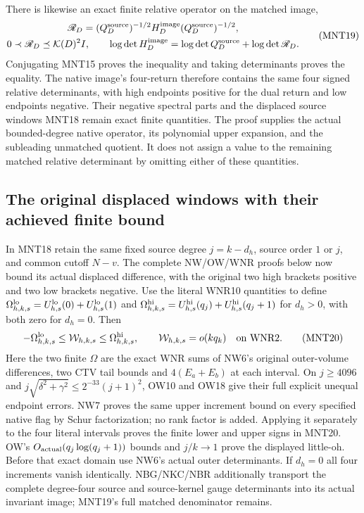 \documentclass[11pt,a4paper]{article}
\begin{document}
There is likewise an exact finite relative operator
on the matched image,
\[
 \begin{gathered}
 \mathscr R_D=(Q_D^{\rm source})^{-1/2}
                    H_D^{\rm image}(Q_D^{\rm source})^{-1/2},\\
 0\prec\mathscr R_D\preceq\mathcal K(D)^2I,\qquad
 \log\det H_D^{\rm image}
    =\log\det Q_D^{\rm source}+\log\det\mathscr R_D .
 \end{gathered}
 \tag{MNT19}
\]
Conjugating MNT15 proves the inequality and taking
determinants proves the equality. The native image's
four-return therefore contains the same four signed
relative determinants, with high endpoints positive
for the dual return and low endpoints negative.
Their negative spectral parts and the displaced
source windows MNT18 remain exact finite quantities.
The proof supplies the actual bounded-degree native
operator, its polynomial upper expansion, and the
subleading unmatched quotient. It does not assign a
value to the remaining matched relative determinant
by omitting either of these quantities.


\subsection{The original displaced windows with their achieved finite bound}
In MNT18 retain the same fixed source degree $j=k-d_h$, source
order $1$ or $j$, and common cutoff $N-v$. The complete NW/OW/WNR
proofs below now bound its actual displaced difference, with
the original two high brackets positive and two low brackets negative.
Use the literal WNR10 quantities to define
$\Omega_{h,k,s}^{\rm lo}=U_{h,s}^{\rm lo}(0)+U_{h,s}^{\rm lo}(1)$
and $\Omega_{h,k,s}^{\rm hi}=U_{h,s}^{\rm hi}(q_j)+U_{h,s}^{\rm hi}(q_j+1)$
for $d_h>0$, with both zero for $d_h=0$. Then
\[
 -\Omega_{h,k,s}^{\rm lo}\le\mathcal W_{h,k,s}
                         \le\Omega_{h,k,s}^{\rm hi},\qquad
 \mathcal W_{h,k,s}=o(kq_k)\quad\hbox{on WNR2}.\tag{MNT20}
\]
Here the two finite $\Omega$ are the exact WNR sums of NW6's
original outer-volume differences, two CTV tail bounds and
$4(E_a+E_b)$ at each interval. On $j\ge4096$ and
$j\sqrt{\delta^2+\gamma^2}\le2^{-33}(j+1)^2$, OW10 and OW18
give their full explicit unequal endpoint errors. NW7 proves the
same upper increment bound on every specified native flag by Schur
factorization; no rank factor is added. Applying it separately to
the four literal intervals proves the finite lower and upper signs
in MNT20. OW's $O_{\rm actual}(q_j\log(q_j+1))$ bounds and
$j/k\to1$ prove the displayed little-oh. Before that exact domain
use NW6's actual outer determinants. If $d_h=0$ all four increments
vanish identically. NBG/NKC/NBR additionally transport the complete
degree-four source and source-kernel gauge determinants into its
actual invariant image; MNT19's full matched denominator remains.
\end{document}
